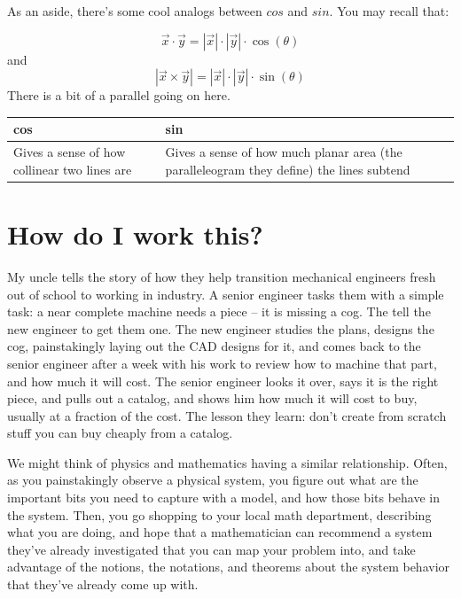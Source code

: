 \documentclass[
]{book}
\begin{document}
As an aside, there's some cool analogs between \(cos\) and \(sin\). You may recall that:

\[\vec{x} \cdot \vec{y} = |\vec{x}| \cdot |\vec{y}| \cdot \cos(\theta)\]
and
\[|\vec{x} \times \vec{y}| = |\vec{x}| \cdot |\vec{y}| \cdot \sin(\theta)\]
There is a bit of a parallel going on here.

\begin{longtable}[]{@{}
  >{\raggedright\arraybackslash}p{}
  >{\raggedright\arraybackslash}p{}@{}}
\toprule
cos & sin \\
\midrule
\endhead
Gives a sense of how collinear two lines are & Gives a sense of how much planar area (the paralleleogram they define) the lines subtend \\
\bottomrule
\end{longtable}

\hypertarget{how-do-i-work-this}{%
\chapter{How do I work this?}\label{how-do-i-work-this}}

My uncle tells the story of how they help transition mechanical engineers fresh out of school to working in industry. A senior engineer tasks them with a simple task: a near complete machine needs a piece -- it is missing a cog. The tell the new engineer to get them one. The new engineer studies the plans, designs the cog, painstakingly laying out the CAD designs for it, and comes back to the senior engineer after a week with his work to review how to machine that part, and how much it will cost. The senior engineer looks it over, says it is the right piece, and pulls out a catalog, and shows him how much it will cost to buy, usually at a fraction of the cost. The lesson they learn: don't create from scratch stuff you can buy cheaply from a catalog.

We might think of physics and mathematics having a similar relationship. Often, as you painstakingly observe a physical system, you figure out what are the important bits you need to capture with a model, and how those bits behave in the system. Then, you go shopping to your local math department, describing what you are doing, and hope that a mathematician can recommend a system they've already investigated that you can map your problem into, and take advantage of the notions, the notations, and theorems about the system behavior that they've already come up with.
\end{document}
